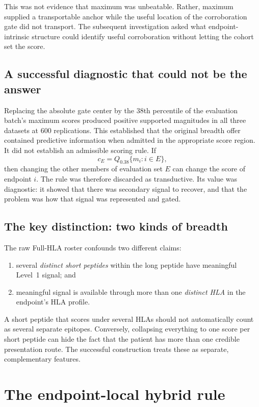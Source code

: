 \documentclass[11pt]{article}
\begin{document}
This was not evidence that maximum was unbeatable. Rather, maximum supplied a
transportable anchor while the useful location of the corroboration gate did
not transport. The subsequent investigation asked what endpoint-intrinsic
structure could identify useful corroboration without letting the cohort set
the score.

\subsection{A successful diagnostic that could not be the answer}

Replacing the absolute gate center by the 38th percentile of the evaluation
batch's maximum scores produced positive supported magnitudes in all three
datasets at 600 replications. This established that the original breadth offer
contained predictive information when admitted in the appropriate score
region. It did not establish an admissible scoring rule. If
\begin{equation}
c_E=Q_{0.38}\{m_i:i\in E\},
\end{equation}
then changing the other members of evaluation set $E$ can change the score of
endpoint $i$. The rule was therefore discarded as transductive. Its value was
diagnostic: it showed that there was secondary signal to recover, and that the
problem was how that signal was represented and gated.

\subsection{The key distinction: two kinds of breadth}

The raw Full-HLA roster confounds two different claims:
\begin{enumerate}
  \item several \emph{distinct short peptides} within the long peptide have
  meaningful Level~1 signal; and
  \item meaningful signal is available through more than one \emph{distinct
  HLA} in the endpoint's HLA profile.
\end{enumerate}
A short peptide that scores under several HLAs should not automatically count
as several separate epitopes. Conversely, collapsing everything to one score
per short peptide can hide the fact that the patient has more than one credible
presentation route. The successful construction treats these as separate,
complementary features.

\section{The endpoint-local hybrid rule}
\end{document}
